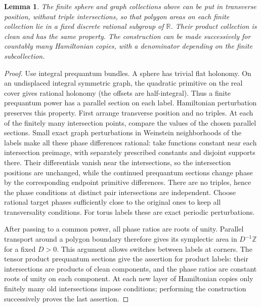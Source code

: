 \documentclass[11pt]{article}
\numberwithin{equation}{section}
\newtheorem{lemma}[theorem]{Lemma}
\theoremstyle{definition}
\theoremstyle{remark}
\begin{document}
\begin{lemma}\label{lem:rational-label-areas}
The finite sphere and graph collections above can be put in transverse
position, without triple intersections, so that polygon areas on
each finite collection lie in a fixed discrete rational subgroup of
$\mathbb R$.  Their product collection is clean and has the same property.
The construction can be made successively for countably many
Hamiltonian copies, with a denominator depending on the finite
subcollection.
\end{lemma}
\begin{proof}
Use integral prequantum bundles.  A sphere has trivial flat holonomy.
On an undisplaced integral symmetric graph, the quadratic primitive
on the real cover gives rational holonomy (the offsets are
half-integral).  Thus a finite prequantum power has a parallel section
on each label.  Hamiltonian perturbation preserves this property.
First arrange transverse position and no triples.  At each of the
finitely many intersection points, compare the values of the chosen
parallel sections.  Small exact graph perturbations in Weinstein
neighborhoods of the labels make all these
phase differences rational: take functions constant near each
intersection preimage, with separately prescribed constants and
disjoint supports there.  Their differentials vanish near the
intersections, so the intersection positions are unchanged, while
the continued prequantum sections change phase by the corresponding
endpoint primitive differences.  There are no triples, hence the
phase conditions at distinct pair intersections are independent.
Choose rational target phases sufficiently close to the original
ones to keep all transversality conditions.  For torus labels these
are exact periodic perturbations.

After passing to a common power, all phase ratios are roots of unity.
Parallel transport around a polygon boundary therefore gives its
symplectic area in $D^{-1}\mathbb Z$ for a fixed $D>0$.  This argument allows
switches between labels at corners.  The tensor product prequantum
sections give the assertion for product labels: their intersections
are products of clean components, and the phase ratios are constant
roots of unity on each component.  At each new layer of Hamiltonian
copies only finitely many old intersections impose conditions;
performing the construction successively proves the last assertion.
\end{proof}
\end{document}
